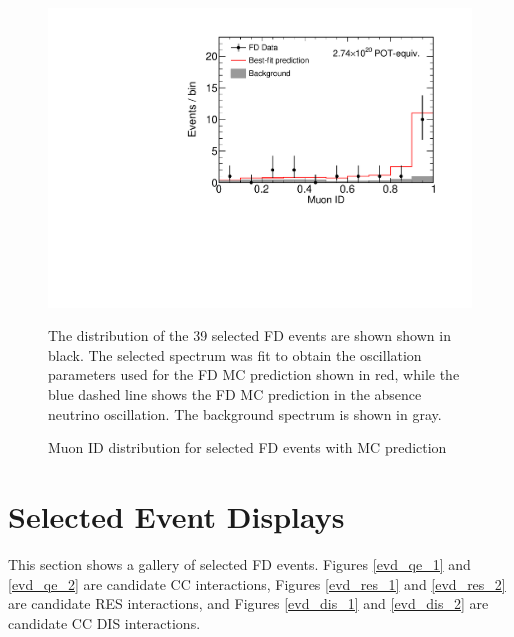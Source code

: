 \begin{figure}
\begin{center}
\includegraphics[width=\textwidth]{figures/results/fd_data_mc_numi_plots/remid_unblind.pdf}
\end{center}
\caption{ Muon ID distribution for selected FD events with MC prediction }{
The distribution of the 39 selected FD events are shown shown in black.
The selected spectrum was fit to obtain the oscillation parameters used
for the FD MC prediction shown in red, while
the blue dashed line shows the FD MC prediction in the absence neutrino
oscillation.
The background spectrum is shown in gray.
}
\label{remid_unblind}

\end{figure}


\clearpage

\section{Selected Event Displays}

This section shows a gallery of selected FD events.  Figures \ref{evd_qe_1} and
\ref{evd_qe_2} are candidate \numu CC interactions, Figures \ref{evd_res_1}
and \ref{evd_res_2} are candidate \numu RES interactions,
and Figures \ref{evd_dis_1} and \ref{evd_dis_2} are candidate \numu CC DIS
interactions.





